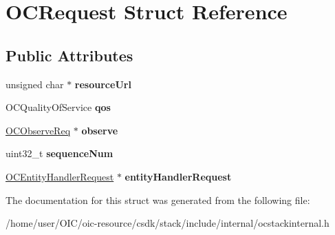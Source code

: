 \hypertarget{structOCRequest}{}\section{O\+C\+Request Struct Reference}
\label{structOCRequest}
\subsection*{Public Attributes}
\begin{DoxyCompactItemize}
\item 
\hypertarget{structOCRequest_a83c9b26fcf3537627e70b8c36b499e4d}{}unsigned char $\ast$ {\bfseries resource\+Url}\label{structOCRequest_a83c9b26fcf3537627e70b8c36b499e4d}

\item 
\hypertarget{structOCRequest_affed98737658b993812311619fc920c1}{}O\+C\+Quality\+Of\+Service {\bfseries qos}\label{structOCRequest_affed98737658b993812311619fc920c1}

\item 
\hypertarget{structOCRequest_a9e4aeab0321bf50e6ab8ce210099ec56}{}\hyperlink{structOCObserveReq}{O\+C\+Observe\+Req} $\ast$ {\bfseries observe}\label{structOCRequest_a9e4aeab0321bf50e6ab8ce210099ec56}

\item 
\hypertarget{structOCRequest_a4a8b2990f0bdcd5722278433fe5e6600}{}uint32\+\_\+t {\bfseries sequence\+Num}\label{structOCRequest_a4a8b2990f0bdcd5722278433fe5e6600}

\item 
\hypertarget{structOCRequest_a5a0b8804a6eaab598454403c35d23591}{}\hyperlink{structOCEntityHandlerRequest}{O\+C\+Entity\+Handler\+Request} $\ast$ {\bfseries entity\+Handler\+Request}\label{structOCRequest_a5a0b8804a6eaab598454403c35d23591}

\end{DoxyCompactItemize}


The documentation for this struct was generated from the following file\+:\begin{DoxyCompactItemize}
\item 
/home/user/\+O\+I\+C/oic-\/resource/csdk/stack/include/internal/ocstackinternal.\+h\end{DoxyCompactItemize}
